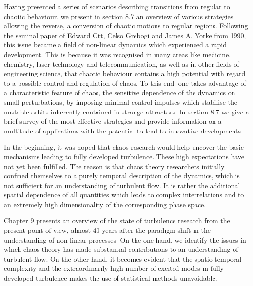 \documentclass[12pt]{article}
\begin{document}
Having presented a series of scenarios describing transitions from regular to chaotic
behaviour, we present in section 8.7 an overview of various strategies allowing the
reverse, a conversion of chaotic motions to regular regions. Following the seminal
paper of Edward Ott, Celso Grebogi and James A. Yorke from 1990, this issue became
a field of non-linear dynamics which experienced a rapid development. This is
because it was recognised in many areas like medicine, chemistry, laser technology
and telecommunication, as well as in other fields of engineering science, that chaotic
behaviour contains a high potential with regard to a possible control and regulation
of chaos. To this end, one takes advantage of a characteristic feature of chaos, the
sensitive dependence of the dynamics on small perturbations, by imposing minimal
control impulses which stabilise the unstable orbits inherently contained in strange
attractors. In section 8.7 we give a brief survey of the most effective strategies and
provide information on a multitude of applications with the potential to lead to
innovative developments.

\hfill

In the beginning, it was hoped that chaos research would help uncover the basic
mechanisms leading to fully developed turbulence. These high expectations have
not yet been fulfilled. The reason is that chaos theory researchers initially confined
themselves to a purely temporal description of the dynamics, which is not sufficient
for an understanding of turbulent flow. It is rather the additional spatial dependence
of all quantities which leads to complex interrelations and to an extremely
high dimensionality of the corresponding phase space.

\hfill

Chapter 9 presents an overview of the state of turbulence research from the present
point of view, almost 40 years after the paradigm shift in the understanding of
non-linear processes. On the one hand, we identify the issues in which chaos theory
has made substantial contributions to an understanding of turbulent flow. On
the other hand, it becomes evident that the spatio-temporal complexity and the
extraordinarily high number of excited modes in fully developed turbulence makes
the use of statistical methods unavoidable.

\hfill
\end{document}

